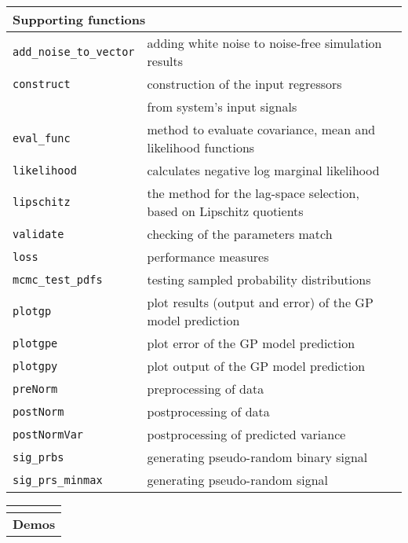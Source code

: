\documentclass[12pt,twoside]{article}
\newcommand{\fun}[1]{{\tt {#1}}}
\def\tabelarule{\rule[-3mm]{0mm}{10mm}}
\begin{document}
{\begin{tabular}{|l|l|c|}
 \hline \multicolumn{2}{|l|}{\tabelarule \bf Supporting functions}\\
 \hline \fun{add\_noise\_to\_vector} & adding white noise to noise-free simulation results\\
 \hline \fun{construct} & construction of the input regressors\\
  & from system's input signals\\
 \hline \fun{eval\_func} & method to evaluate covariance, mean and likelihood functions\\
 \hline \fun{likelihood} & calculates negative log marginal likelihood\\
 \hline \fun{lipschitz} & the method for the lag-space selection, based on Lipschitz quotients\\
 \hline \fun{validate} & checking of the parameters match \\
 \hline \fun{loss} & performance measures \\
 \hline \fun{mcmc\_test\_pdfs} & testing sampled probability distributions\\
 \hline \fun{plotgp} & plot results (output and error) of the GP model prediction \\
 \hline \fun{plotgpe} & plot error of the GP model prediction \\
 \hline \fun{plotgpy} & plot output of the GP model prediction \\
 \hline \fun{preNorm} & preprocessing of data \\
 \hline \fun{postNorm} & postprocessing of data \\
 \hline \fun{postNormVar} & postprocessing of predicted variance\\
 \hline \fun{sig\_prbs} & generating pseudo-random binary signal \\
 \hline \fun{sig\_prs\_minmax} & generating pseudo-random signal \\ \hline


\end{tabular}




\begin{tabular}{|l|l|}


 \multicolumn{2}{l}{\tabelarule \bf } \\

%
 \hline \multicolumn{2}{|l|}{\tabelarule \bf Demos}\\


\end{tabular}}
\end{document}
